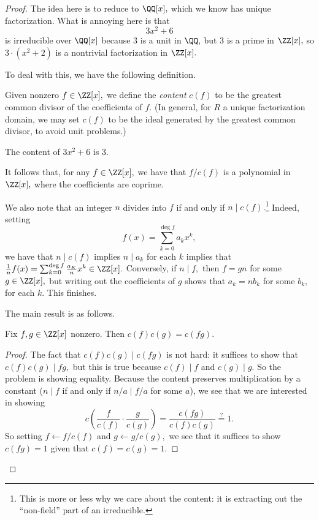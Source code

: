\documentclass[../notes.tex]{subfiles}
\begin{document}
\begin{proof}
	The idea here is to reduce to $\QQ[x],$ which we know has unique factorization. What is annoying here is that
	\[3x^2+6\]
	is irreducible over $\QQ[x]$ because $3$ is a unit in $\QQ,$ but $3$ is a prime in $\ZZ[x],$ so $3\cdot\left(x^2+2\right)$ is a nontrivial factorization in $\ZZ[x].$

	To deal with this, we have the following definition.
	\begin{definition}[Content]
		Given nonzero $f\in\ZZ[x],$ we define the \textit{content} $c(f)$ to be the greatest common divisor of the coefficients of $f.$ (In general, for $R$ a unique factorization domain, we may set $c(f)$ to be the ideal generated by the greatest common divisor, to avoid unit problems.)
	\end{definition}
	\begin{example}
		The content of $3x^2+6$ is $3.$
	\end{example}
	It follows that, for any $f\in\ZZ[x],$ we have that $f/c(f)$ is a polynomial in $\ZZ[x],$ where the coefficients are coprime.

	We also note that an integer $n$ divides into $f$ if and only if $n\mid c(f).$\footnote{This is more or less why we care about the content: it is extracting out the ``non-field'' part of an irreducible.} Indeed, setting
	\[f(x)=\sum_{k=0}^{\deg f}a_kx^k,\]
	we have that $n\mid c(f)$ implies $n\mid a_k$ for each $k$ implies that $\frac1nf(x)=\sum_{k=0}^{\deg f}\frac{a_K}nx^k\in\ZZ[x].$ Conversely, if $n\mid f,$ then $f=gn$ for some $g\in\ZZ[x],$ but writing out the coefficients of $g$ shows that $a_k=nb_k$ for some $b_k,$ for each $k.$ This finishes.

	The main result is as follows.
	\begin{lemma}[Gauss's] \label{lem:gauss}
		Fix $f,g\in\ZZ[x]$ nonzero. Then $c(f)c(g)=c(fg).$
	\end{lemma}
	\begin{proof}
		The fact that $c(f)c(g)\mid c(fg)$ is not hard: it suffices to show that $c(f)c(g)\mid fg,$ but this is true because $c(f)\mid f$ and $c(g)\mid g.$ So the problem is showing equality. Because the content preserves multiplication by a constant ($n\mid f$ if and only if $n/a\mid f/a$ for some $a$), we see that we are interested in showing
		\[c\left(\frac f{c(f)}\cdot\frac g{c(g)}\right)=\frac{c(fg)}{c(f)c(g)}\stackrel?=1.\]
		So setting $f\leftarrow f/c(f)$ and $g\leftarrow g/c(g),$ we see that it suffices to show $c(fg)=1$ given that $c(f)=c(g)=1.$


\end{proof}
\end{proof}
\end{document}
